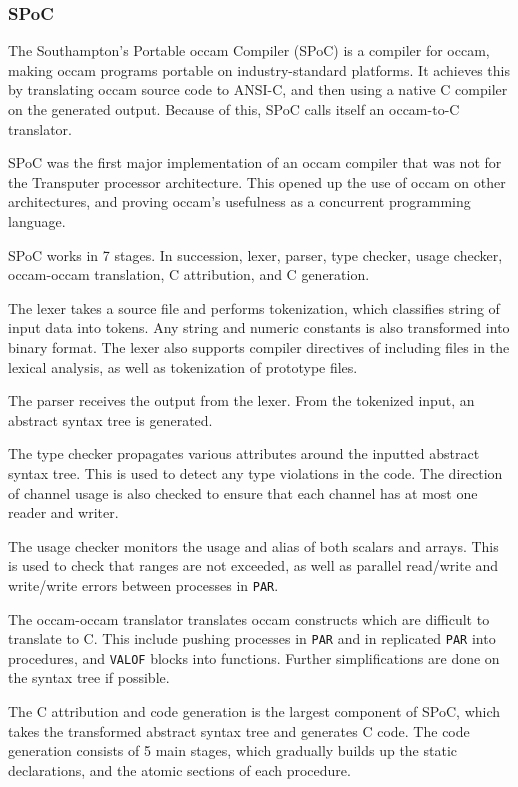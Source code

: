 \subsubsection{SPoC}
\label{sssec:spoc}

The Southampton's Portable occam Compiler (SPoC) \citep{spoc} is a compiler for occam, making occam programs portable on industry-standard platforms. It achieves this by translating occam source code to ANSI-C, and then using a native C compiler on the generated output. Because of this, SPoC calls itself an occam-to-C translator. 

SPoC was the first major implementation of an occam compiler that was not for the Transputer processor architecture. This opened up the use of occam on other architectures, and proving occam's usefulness as a concurrent programming language.

SPoC works in 7 stages. In succession, lexer, parser, type checker, usage checker, occam\hyp{}occam translation, C attribution, and C generation. 

The lexer takes a source file and performs tokenization, which classifies string of input data into tokens. Any string and numeric constants is also transformed into binary format. The lexer also supports compiler directives of including files in the lexical analysis, as well as tokenization of prototype files.

The parser receives the output from the lexer. From the tokenized input, an abstract syntax tree is generated.

The type checker propagates various attributes around the inputted abstract syntax tree. This is used to detect any type violations in the code. The direction of channel usage is also checked to ensure that each channel has at most one reader and writer. 

The usage checker monitors the usage and alias of both scalars and arrays. This is used to check that ranges are not exceeded, as well as parallel read/write and write/write errors  between processes in \texttt{PAR}. 

The occam\hyp{}occam translator translates occam constructs which are difficult to translate to C. This include pushing processes in \texttt{PAR} and in replicated \texttt{PAR} into procedures, and \texttt{VALOF} blocks into functions. Further simplifications are done on the syntax tree if possible. 

The C attribution and code generation is the largest component of SPoC, which takes the transformed abstract syntax tree and generates C code. The code generation consists of 5 main stages, which gradually builds up the static declarations, and the atomic sections of each procedure. 


